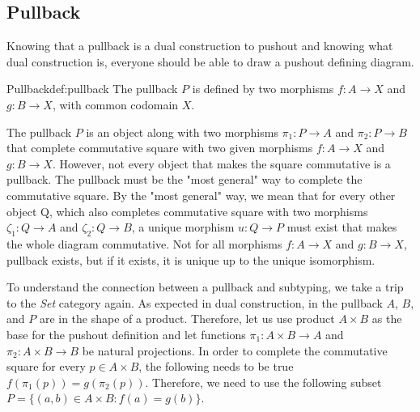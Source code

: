 \subsection{Pullback}
Knowing that a pullback is a dual construction to pushout and knowing what dual construction is, everyone should be able to draw a pushout defining diagram.
\begin{defi}{Pullback}{def:pullback}
The pullback \cite{CategoryTheory} $P$ is defined by two morphisms $f: A \rightarrow X$ and $g: B \rightarrow X$, with common codomain $X$.
\begin{center}
\end{center}
The pullback $P$ is an object along with two morphisms $\pi_1: P \rightarrow A$ and $\pi_2: P \rightarrow B$ that complete commutative square with two given morphisms $f: A \rightarrow X$ and $g: B \rightarrow X$. However, not every object that makes the square commutative is a pullback. The pullback must be the "most general" way to complete the commutative square. By the "most general" way, we mean that for every other object Q, which also completes commutative square with two morphisms $\zeta_1: Q \rightarrow A$ and $\zeta_2: Q \rightarrow B$, a unique morphism $u: Q \rightarrow P$ must exist that makes the whole diagram commutative. Not for all morphisms $f: A \rightarrow X$ and $g: B \rightarrow X$, pullback exists, but if it exists, it is unique up to the unique isomorphism.
\end{defi}
To understand the connection between a pullback and subtyping, we take a trip to the \emph{Set} category again. As expected in dual construction, in the pullback $A$, $B$, and $P$ are in the shape of a product. Therefore, let us use product $A \times B$ as the base for the pushout definition and let functions $\pi_1: A \times B \rightarrow A$ and $\pi_2: A \times B \rightarrow B$ be natural projections. In order to complete the commutative square for every $p \in A \times B$, the following needs to be true $f (\pi_1 (p)) = g (\pi_2(p))$. Therefore, we need to use the following subset $P = \{(a, b) \in A \times B : f(a) = g(b)\}$. 
